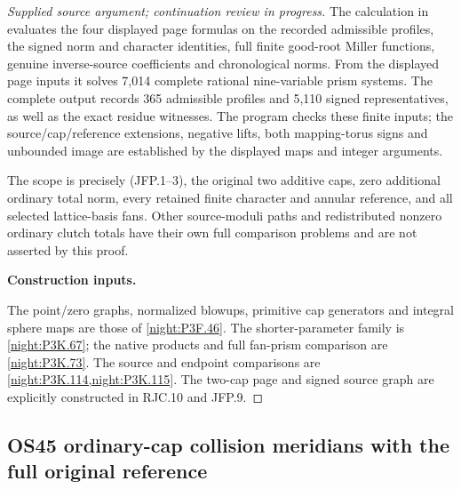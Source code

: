 \begin{proof}[Supplied source argument; continuation review in progress]
The calculation in  evaluates the four displayed
page formulas on the recorded admissible profiles, the signed norm and
character identities, full finite good-root
Miller functions, genuine inverse-source coefficients and chronological
norms. From the displayed page inputs it solves 7,014 complete rational
nine-variable prism systems. The complete output 
records 365 admissible profiles and 5,110 signed representatives, as
well as the exact residue witnesses. The program checks these finite
inputs; the source/cap/reference extensions, negative lifts, both
mapping-torus signs and unbounded image are established by the
displayed maps and integer arguments.

The scope is precisely (JFP.1--3), the original two additive
caps, zero additional ordinary total norm, every retained
finite character and annular reference, and all selected
lattice-basis fans. Other source-moduli paths and redistributed
nonzero ordinary clutch totals have their own full comparison
problems and are not asserted by this proof.




\par\medskip\noindent\textbf{Construction inputs.}\par
The point/zero graphs, normalized blowups, primitive cap generators
and integral sphere maps are those of \cref{night:P3F.46}.
The shorter-parameter family is \cref{night:P3K.67}; the native products
and full fan-prism comparison are \cref{night:P3K.73}.
The source and endpoint comparisons are
\cref{night:P3K.114,night:P3K.115}. The two-cap page and signed source
graph are explicitly constructed in RJC.10 and JFP.9.





\end{proof}


\subsection{OS45 ordinary-cap collision meridians with the full original reference}
